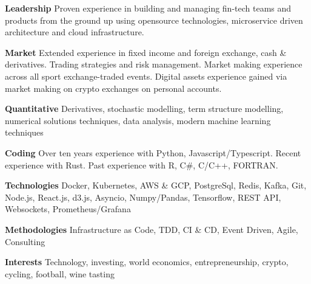 {\bf Leadership} Proven experience in building and managing fin-tech teams and products from
the ground up using opensource technologies, microservice driven architecture and cloud infrastructure.

{\bf Market} Extended experience in fixed income and foreign exchange, cash \& derivatives.
Trading strategies and risk management.
Market making experience across all sport exchange-traded events.
Digital assets experience gained via market making on crypto exchanges on personal accounts.

{\bf Quantitative} Derivatives, stochastic modelling, term structure modelling, numerical solutions techniques,
data analysis, modern machine learning techniques

{\bf Coding} Over ten years experience with Python, Javascript/Typescript. Recent experience with Rust.
Past experience with R, C\#, C/C++, FORTRAN.

{\bf Technologies} Docker, Kubernetes, AWS \& GCP, PostgreSql, Redis, Kafka, Git, Node.js, React.js, d3.js, Asyncio, Numpy/Pandas,
Tensorflow, REST API, Websockets, Prometheus/Grafana

{\bf Methodologies} Infrastructure as Code, TDD, CI \& CD, Event Driven, Agile, Consulting

{\bf Interests} Technology, investing, world economics, entrepreneurship, crypto, cycling, football, wine tasting

